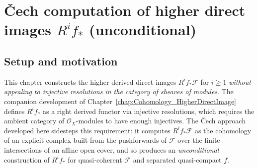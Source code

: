 \chapter{{\v C}ech computation of higher direct images $R^i f_*$ (unconditional)}
\label{chap:Cohomology_CechHigherDirectImage}

\section{Setup and motivation}

This chapter constructs the higher derived direct images \(R^i f_*\mathcal{F}\) for
\(i \geq 1\) \emph{without appealing to injective resolutions in the category of
sheaves of modules}. The companion development of
Chapter~\ref{chap:Cohomology_HigherDirectImage} defines \(R^i f_*\) as a right
derived functor via injective resolutions, which requires the ambient category of
\(\mathcal{O}_X\)-modules to have enough injectives. The {\v C}ech approach
developed here sidesteps this requirement:
it computes \(R^i f_*\mathcal{F}\) as the cohomology of an explicit complex built
from the pushforwards of \(\mathcal{F}\) over the finite intersections of an affine
open cover, and so produces an \emph{unconditional} construction of \(R^i f_*\) for
quasi-coherent \(\mathcal{F}\) and separated quasi-compact \(f\).

